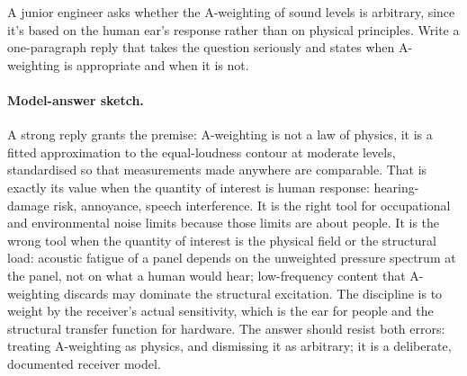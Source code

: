 \begin{exercise}
A junior engineer asks whether the A-weighting of sound levels is
arbitrary, since it's based on the human ear's response rather than
on physical principles. Write a one-paragraph reply that takes the
question seriously and states when A-weighting is appropriate and
when it is not.
\paragraph{Model-answer sketch.} A strong reply grants the premise:
A-weighting is not a law of physics, it is a fitted approximation to
the equal-loudness contour at moderate levels, standardised so that
measurements made anywhere are comparable. That is exactly its value
when the quantity of interest is human response: hearing-damage risk,
annoyance, speech interference. It is the right tool for occupational
and environmental noise limits because those limits are about people.
It is the wrong tool when the quantity of interest is the physical
field or the structural load: acoustic fatigue of a panel depends on
the unweighted pressure spectrum at the panel, not on what a human
would hear; low-frequency content that A-weighting discards may
dominate the structural excitation. The discipline is to weight by the
receiver's actual sensitivity, which is the ear for people and the
structural transfer function for hardware. The answer should resist
both errors: treating A-weighting as physics, and dismissing it as
arbitrary; it is a deliberate, documented receiver model.
\end{exercise}

